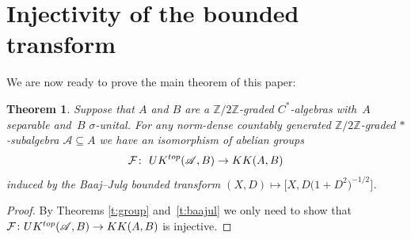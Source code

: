 \documentclass[11pt]{article}
\numberwithin{equation}{section}
\newtheorem{Theorem}{Theorem}[section]
\newcommand{\zz}{\mathbb{Z}}
\newcommand{\si}{\sigma}
\newcommand{\C}[1]{\mathcal{#1}}
\newcommand{\s}[1]{\mathscr{#1}}
\newcommand{\su}{\subseteq}
\begin{document}
\section{Injectivity of the bounded transform}\label{s:injbou}
We are now ready to prove the main theorem of this paper:

\begin{Theorem}\label{t:isobaajul}
Suppose that $A$ and $B$ are a $\zz/2\zz$-graded $C^*$-algebras with~$A$ separable and~$B$ $\si$-unital. For any norm-dense countably generated $\zz/2\zz$-graded $*$-subalgebra $\s A \su A$ we have an isomorphism of abelian groups
\[
\C F\colon \ UK^{{\rm top}}(\s A, B) \to KK(A,B)
\]
induced by the Baaj--Julg bounded transform $(X,D) \mapsto \big[X, D\big(1 + D^2\big)^{-1/2}\big]$.
\end{Theorem}
\begin{proof}
By Theorems \ref{t:group} and~\ref{t:baajul} we only need to show that $\C F\colon UK^{{\rm top}}(\s A,B) \to KK(A,B)$ is injective.


\end{proof}
\end{document}

